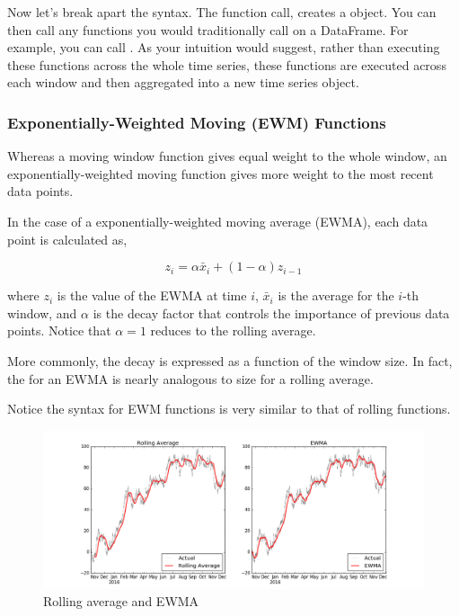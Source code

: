 Now let's break apart the syntax. The function call,  creates a  object. You can then call any functions you would traditionally call on a DataFrame. For example, you can call . As your intuition would suggest, rather than executing these functions across the whole time series, these functions are executed across each window and then aggregated into a new time series object.

\subsubsection*{Exponentially-Weighted Moving (EWM) Functions}
Whereas a moving window function gives equal weight to the whole window, an exponentially-weighted moving function gives more weight to the most recent data points.

In the case of a exponentially-weighted moving average (EWMA), each data point is calculated as,

$$
z_i = \alpha \bar{x}_i + (1 - \alpha)z_{i-1}
$$

where $z_i$ is the value of the EWMA at time $i$, $\bar{x}_i$ is the average for the $i$-th window, and $\alpha$ is the decay factor that controls the importance of previous data points. Notice that $\alpha=1$ reduces to the rolling average.

More commonly, the decay is expressed as a function of the window size. In fact, the  for an EWMA is nearly analogous to  size for a rolling average.

Notice the syntax for EWM functions is very similar to that of rolling functions.

\begin{figure} \label{fig:moving}
    \includegraphics[width=\textwidth]{moving.png}
    \caption{Rolling average and EWMA}
\end{figure}

